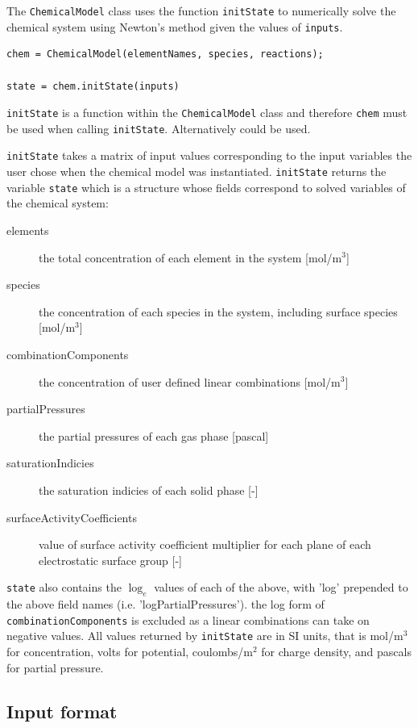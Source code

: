 \documentclass{article}
\begin{document}
The \verb|ChemicalModel| class uses the function \verb|initState| to numerically solve the chemical system using Newton's method given the values of \verb|inputs|. 

\begin{lstlisting}
chem = ChemicalModel(elementNames, species, reactions);

state = chem.initState(inputs)
\end{lstlisting}
\verb|initState| is a function within the \verb|ChemicalModel| class and therefore \verb|chem| must be used when calling \verb|initState|. Alternatively  could be used. 

\verb|initState| takes a matrix of input values corresponding to the input variables the user chose when the chemical model was instantiated. \verb|initState| returns the variable \verb|state| which is a structure whose fields correspond to solved variables of the chemical system:
{\footnotesize
\begin{description}
\item[elements] the total concentration of each element in the system [mol/m$^3$]
\item[species] the concentration of each species in the system, including surface species [mol/m$^3$]
\item[combinationComponents] the concentration of user defined linear combinations [mol/m$^3$]
\item[partialPressures] the partial pressures of each gas phase [pascal]
\item[saturationIndicies] the saturation indicies of each solid phase [-]
\item[surfaceActivityCoefficients] value of surface activity coefficient multiplier for each plane of each electrostatic surface group [-]
\end{description}}
\verb|state| also contains the $\log_e$ values of each of the above, with 'log' prepended to the above field names (i.e. 'logPartialPressures'). the log form of \verb|combinationComponents| is excluded as a linear combinations can take on negative values. All values returned by \verb|initState| are in SI units, that is mol/m$^3$ for concentration, volts for potential, coulombs/m$^2$ for charge density, and pascals for partial pressure.

\subsection{Input format} \label{sec:format}
\end{document}
